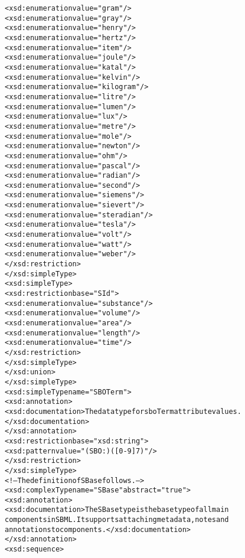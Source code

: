 \begin{alltt}
                    <xsd:enumeration value="gram"/>
                    <xsd:enumeration value="gray"/>
                    <xsd:enumeration value="henry"/>
                    <xsd:enumeration value="hertz"/>
                    <xsd:enumeration value="item"/>
                    <xsd:enumeration value="joule"/>
                    <xsd:enumeration value="katal"/>
                    <xsd:enumeration value="kelvin"/>
                    <xsd:enumeration value="kilogram"/>
                    <xsd:enumeration value="litre"/>
                    <xsd:enumeration value="lumen"/>
                    <xsd:enumeration value="lux"/>
                    <xsd:enumeration value="metre"/>
                    <xsd:enumeration value="mole"/>
                    <xsd:enumeration value="newton"/>
                    <xsd:enumeration value="ohm"/>
                    <xsd:enumeration value="pascal"/>
                    <xsd:enumeration value="radian"/>
                    <xsd:enumeration value="second"/>
                    <xsd:enumeration value="siemens"/>
                    <xsd:enumeration value="sievert"/>
                    <xsd:enumeration value="steradian"/>
                    <xsd:enumeration value="tesla"/>
                    <xsd:enumeration value="volt"/>
                    <xsd:enumeration value="watt"/>
                    <xsd:enumeration value="weber"/>
                </xsd:restriction>
            </xsd:simpleType>
            <xsd:simpleType>
                <xsd:restriction base="SId">
                    <xsd:enumeration value="substance"/>
                    <xsd:enumeration value="volume"/>
                    <xsd:enumeration value="area"/>
                    <xsd:enumeration value="length"/>
                    <xsd:enumeration value="time"/>
                </xsd:restriction>
            </xsd:simpleType>
        </xsd:union>
    </xsd:simpleType>
    <xsd:simpleType name="SBOTerm">
        <xsd:annotation>
            <xsd:documentation>The data type for sboTerm attribute values.</xsd:documentation>
        </xsd:annotation>
        <xsd:restriction base="xsd:string">
            <xsd:pattern value="(SBO:)([0-9]{7})"/>
        </xsd:restriction>
    </xsd:simpleType>
    <!--The definition of SBase follows.-->
    <xsd:complexType name="SBase" abstract="true">
        <xsd:annotation>
            <xsd:documentation>The SBase type is the base type of all main
            components in SBML.  It supports attaching metadata, notes and
            annotations to components.</xsd:documentation>
        </xsd:annotation>
        <xsd:sequence>

\end{alltt}
